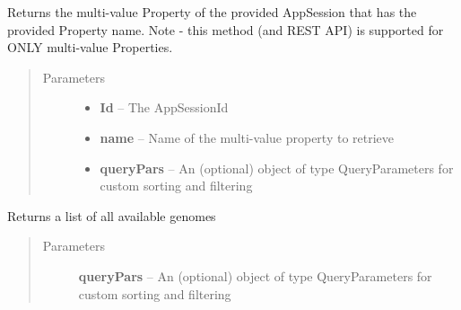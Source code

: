 \documentclass[letterpaper,10pt,english]{sphinxmanual}
\begin{document}
\begin{fulllineitems}
\begin{fulllineitems}
\begin{quote}
\begin{description}
\begin{itemize}
\end{itemize}

\end{description}\end{quote}

\end{fulllineitems}


\begin{fulllineitems}
\label{Available modules:BaseSpacePy.api.BaseSpaceAPI.BaseSpaceAPI.getAppSessionPropertyByName}
Returns the multi-value Property of the provided AppSession that has the provided Property name.
Note - this method (and REST API) is supported for ONLY multi-value Properties.
\begin{quote}\begin{description}
\item[{Parameters}] \leavevmode\begin{itemize}
\item {} 
\textbf{Id} -- The AppSessionId

\item {} 
\textbf{name} -- Name of the multi-value property to retrieve

\item {} 
\textbf{queryPars} -- An (optional) object of type QueryParameters for custom sorting and filtering

\end{itemize}

\end{description}\end{quote}

\end{fulllineitems}


\begin{fulllineitems}
\label{Available modules:BaseSpacePy.api.BaseSpaceAPI.BaseSpaceAPI.getAvailableGenomes}
Returns a list of all available genomes
\begin{quote}\begin{description}
\item[{Parameters}] \leavevmode
\textbf{queryPars} -- An (optional) object of type QueryParameters for custom sorting and filtering


\end{description}
\end{quote}
\end{fulllineitems}
\end{fulllineitems}
\end{document}
